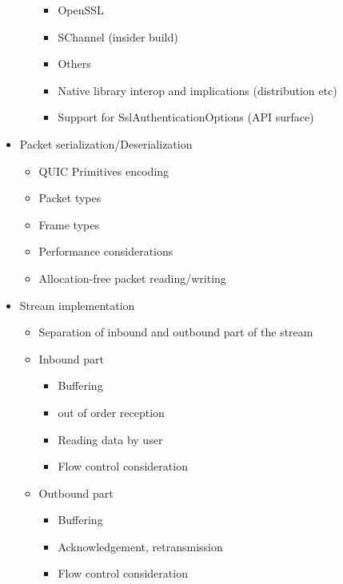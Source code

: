 \begin{itemize}
\begin{itemize}
\begin{itemize}
            \item OpenSSL
            \item SChannel (insider build)
            \item Others
            \item Native library interop and implications (distribution etc)
            \item Support for SslAuthenticationOptions (API surface)

        \end{itemize}
    \end{itemize}

    \item Packet serialization/Deserialization
    \begin{itemize}

        \item QUIC Primitives encoding
        \item Packet types
        \item Frame types
        \item Performance considerations
        \item Allocation-free packet reading/writing

    \end{itemize}

    \item Stream implementation
    \begin{itemize}

        \item Separation of inbound and outbound part of the stream
        \item Inbound part

        \begin{itemize}

            \item Buffering
            \item out of order reception
            \item Reading data by user
            \item Flow control consideration

        \end{itemize}

        \item Outbound part
        \begin{itemize}

            \item Buffering
            \item Acknowledgement, retransmission
            \item Flow control consideration
        \end{itemize}


\end{itemize}
\end{itemize}
